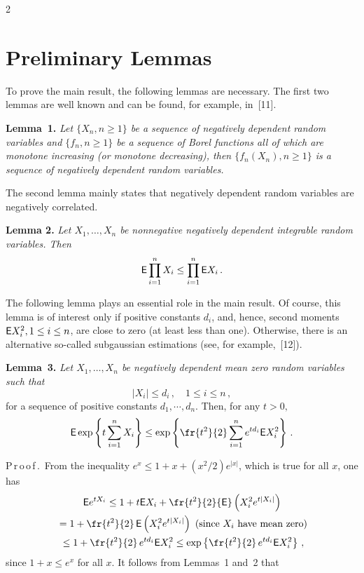 \begin{multicols}{2}
\section{Preliminary Lemmas}

\noindent
To prove the main result, the following lemmas are necessary. The first two lemmas are well known and can be found,
for example, in~[11].

\medskip
\noindent 
\textbf{Lemma~1.} \textit{Let $\{X_n, n\ge 1\}$ be a sequence of negatively dependent  random variables and
$\{f_n, n\ge 1\}$ be a sequence of Borel functions all of which are monotone increasing (or monotone
decreasing), then $\{f_n(X_n), n\ge 1\}$ is a sequence of negatively dependent random variables.}

The second lemma mainly states that negatively dependent random variables are 
negatively correlated.

\medskip

\noindent 
\textbf{Lemma 2.} {\it Let $X_1,\dots, X_n$ be nonnegative negatively dependent integrable random variables. Then}
$$ 
{\sf E} \prod\limits_{i=1}^n X_i \le \prod\limits_{i=1}^n {\sf E}X_i\,. 
$$

\medskip

The following lemma plays an essential role in the main result. Of course, this lemma is of interest only if
positive constants $d_i$, and, hence, second moments ${\sf E}X_i^2, 1\le i \le n$, are close to zero (at least less than
one). Otherwise, there is an alternative so-called subgaussian estimations 
(see, for example,~[12]).

\medskip

\noindent 
\textbf{Lemma~3.} \textit{Let $X_1,\dots, X_n$ be negatively dependent  mean zero random variables such
that}
$$
\left|X_i\right|\le d_i\,, \quad 1\le i\le n\,,
$$
for a sequence of positive constants $d_1,\cdots, d_n$. Then, for any $t>0,$
$$ 
{\sf E} \exp\left\{t\sum\limits_{i=1}^n X_i\right\} \le \exp\left\{\fr{t^2}{2} 
\sum\limits_{i=1}^n e^{td_i} {\sf E}X_i^2 \right\}\,.
$$

\noindent 

P\,r\,o\,o\,f\,.\ From the inequality 
$e^x\le 1+x+({x^2}/{2}) e^{|x|}$, which is true for all $x$, one
has
\begin{multline*}
{\sf E} e^{tX_i} \le 1+ t{\sf E}X_i + \fr{t^2}{2} {\sf E} \left(X_i^2 e^{t|X_i|}\right) \\
{}= 1+ \fr{t^2}{2}\, {\sf E}\left( X_i^2 e^{t|X_i|}\right) \mbox{ (since $X_i$ have mean zero)} \\
{}\le 1+ \fr{t^2}{2}\,e^{td_i}  {\sf E}X_i^2 \le \exp\left\{ \fr{t^2}{2}\,e^{td_i} {\sf E}X_i^2\right\}\,,
\end{multline*}
since $1+x \le e^x$ for all $x$. It follows from Lemmas~1 and~2 that


\end{multicols}
